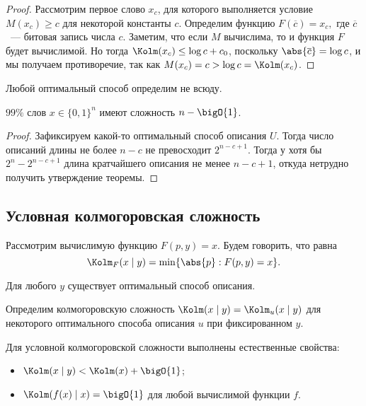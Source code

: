 \begin{proof}
    Рассмотрим первое слово $x_c$, для которого выполняется условие $M(x_c) \ge c$ для некоторой
    константы $c$. Определим функцию $F(\overline{c}) = x_c,$ где $\overline{c}$~--- битовая запись числа
    $c$. Заметим, что если $M$ вычислима, то и функция $F$ будет вычислимой. Но тогда $\Kolm(x_c) \le
    \log c + c_0$, поскольку $\abs{\overline{c}} = \log c$, и мы получаем противоречие, так как
    $M(x_c) = c > \log c = \Kolm(x_c)$. 
\end{proof}

\begin{corollary}
    Любой оптимальный способ определим не всюду.
\end{corollary}

\begin{theorem}
    \label{th:99-words}
    $99\%$ слов $x \in \{0, 1\}^n$ имеют сложность $n - \bigO{1}$. 
\end{theorem}

\begin{proof}
    Зафиксируем какой-то оптимальный способ описания $U$. Тогда число описаний длины не более $n - c$ не
    превосходит $2^{n - c + 1}$. Тогда у хотя бы $2^{n} - 2^{n - c + 1}$ длина кратчайшего описания не
    менее $n - c + 1$, откуда нетрудно получить утверждение теоремы.  
\end{proof}


\subsection{Условная колмогоровская сложность}

Рассмотрим вычислимую функцию $F(p, y) = x$. Будем говорить, что
 равна 
$$
    \Kolm_F(x \mid y) = \min\{\abs{p} : F(p, y) = x \}.
$$ 

\begin{theorem}
    Для любого $y$ существует оптимальный способ описания.
\end{theorem}

\begin{definition}
    Определим колмогоровскую сложность $\Kolm(x \mid y) = \Kolm_u(x \mid y)$ для некоторого оптимального
    способа описания $u$ при фиксированном $y$.
\end{definition}

Для условной колмогоровской сложности выполнены естественные свойства:
\begin{itemize}
    \item $\Kolm(x \mid y) < \Kolm(x) + \bigO{1}$;
    \item $\Kolm(f(x) \mid x) = \bigO{1}$ для любой вычислимой функции $f$.
\end{itemize}

